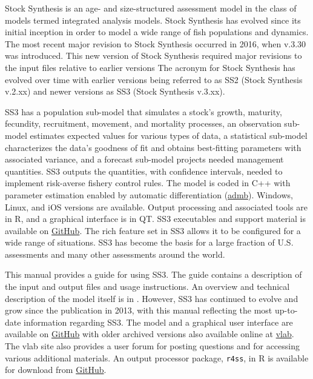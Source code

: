 Stock Synthesis is an age- and size-structured assessment model in the class of models termed integrated analysis models. Stock Synthesis has evolved since its initial inception in order to model a wide range of fish populations and dynamics. The most recent major revision to Stock Synthesis occurred in 2016, when v.3.30 was introduced. This new version of Stock Synthesis required major revisions to the input files relative to earlier versions 
The acronym for Stock Synthesis has evolved over time with earlier versions being referred to as SS2 (Stock Synthesis v.2.xx) and newer versions as SS3 (Stock Synthesis v.3.xx). 

SS3 has a population sub-model that simulates a stock's growth, maturity, fecundity, recruitment, movement, and mortality processes, an observation sub-model estimates expected values for various types of data, a statistical sub-model characterizes the data's goodness of fit and obtains best-fitting parameters with associated variance, and a forecast sub-model projects needed management quantities. SS3 outputs the quantities, with confidence intervals, needed to implement risk-averse fishery control rules. The model is coded in C++ with parameter estimation enabled by automatic differentiation (\href{http://www.admb-project.org}{\gls{admb}}). Windows, Linux, and iOS versions are available. Output processing and associated tools are in R, and a graphical interface is in QT. SS3 executables and support material is available on \href{https://github.com/nmfs-ost}{GitHub}. The rich feature set in SS3 allows it to be configured for a wide range of situations. SS3 has become the basis for a large fraction of U.S. assessments and many other assessments around the world.  

This manual provides a guide for using SS3. The guide contains a description of the input and output files and usage instructions. An overview and technical description of the model itself is in \citet{methotstock2013}. However, SS3 has continued to evolve and grow since the publication in 2013, with this manual reflecting the most up-to-date information regarding SS3. The model and a graphical user interface are available on \href{https://github.com/nmfs-ost}{GitHub} with older archived versions also available online at \href{https://vlab.noaa.gov/web/stock-synthesis}{\gls{vlab}}. The \gls{vlab} site also provides a user forum for posting questions and for accessing various additional materials. An output processor package, \texttt{r4ss}, in R is available for download from \href{https://github.com/r4ss/r4ss}{GitHub}.

